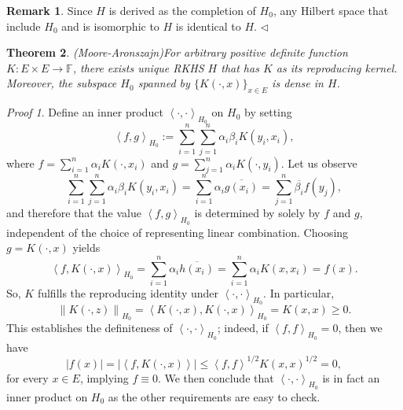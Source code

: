 \documentclass[a4paper,12pt]{article}
\newtheorem{thm}{Theorem}[section]
\theoremstyle{remark}
\newtheorem*{prf}{Proof}
\theoremstyle{definition}
\newtheorem{rem}[thm]{Remark}
\theoremstyle{definition}
\theoremstyle{definition}
\newcommand{\ip}[2]{\left<#1, #2 \right>}
\newcommand{\abs}[1]{\left| #1 \right|}
\newcommand{\norm}[1]{\left\| #1 \right\|}
\newcommand{\fin}{\hfill \( \triangleleft \) }
\begin{document}
\begin{rem}
	Since \( H \) is derived as the completion of \( H_0 \), any Hilbert space that include \( H_0 \) and is isomorphic to \( H \) is identical to \( H \).
	\fin\end{rem}

\begin{thm} (Moore-Aronszajn)\label{Moore Theorem}
	For arbitrary positive definite function \( K:E \times E \to \mathbb{F} \), there exists unique RKHS \( H \) that has \( K \) as its reproducing kernel. Moreover, the subspace \( H_0 \) spanned by \( \{K(\cdot ,x)\}_{x \in E} \) is dense in \( H \).
\end{thm}
\begin{prf}
	Define an inner product \( \ip{\cdot}{\cdot }_{H_0} \) on \( H_0 \) by setting
	\begin{equation*}
		\ip{f}{g}_{H_0} := \sum_{i=1}^{n} \sum_{j=1}^{n} \alpha_i \beta_i K(y_i,x_i),
	\end{equation*}
	where \( f= \sum_{i=1}^{n} \alpha_i K(\cdot ,x_i) \) and \( g= \sum_{j=1}^{n} \alpha_i K(\cdot ,y_i) \). Let us observe
	\begin{equation*}
		\sum_{i=1}^{n} \sum_{j=1}^{n} \alpha_i \beta_i K(y_i,x_i)
		= \sum_{i=1}^{n}\alpha_i \overline{g(x_i)} = \sum_{j=1}^{n} \overline{\beta_i}f(y_j),
	\end{equation*}
	and therefore that the value \( \ip{f}{g}_{H_0} \) is determined by solely by \( f \) and \( g \), independent of the choice of representing linear combination. Choosing \( g=K(\cdot ,x) \) yields
	\begin{equation*}
		\ip{f}{K(\cdot ,x)}_{H_0} = \sum_{i=1}^{n} \alpha_i \overline{h(x_i)}
		= \sum_{i=1}^{n} \alpha_i K(x,x_i) = f(x).
	\end{equation*}
	So, \( K \) fulfills the reproducing identity under \( \ip{\cdot }{\cdot }_{H_0} \). In particular,
	\begin{equation*}
		\norm{K(\cdot ,z)}_{H_0} = \ip{K(\cdot ,x)}{K(\cdot ,x)}_{H_0} = K(x,x) \ge 0.
	\end{equation*}
	This establishes the definiteness of \( \ip{\cdot }{\cdot }_{H_0} \); indeed, if \( \ip{f}{f}_{H_0} = 0 \), then we have
	\begin{equation*}
		\abs{f(x)} = \abs{\ip{f}{K(\cdot ,x)}} \le \ip{f}{f}^{1/2}K(x,x)^{1/2}=0,
	\end{equation*}
	for every \( x \in E \), implying \( f \equiv 0 \). We then conclude that \( \ip{\cdot }{\cdot }_{H_0} \) is in fact an inner product on \( H_0 \) as the other requirements are easy to check.


\end{prf}
\end{document}
